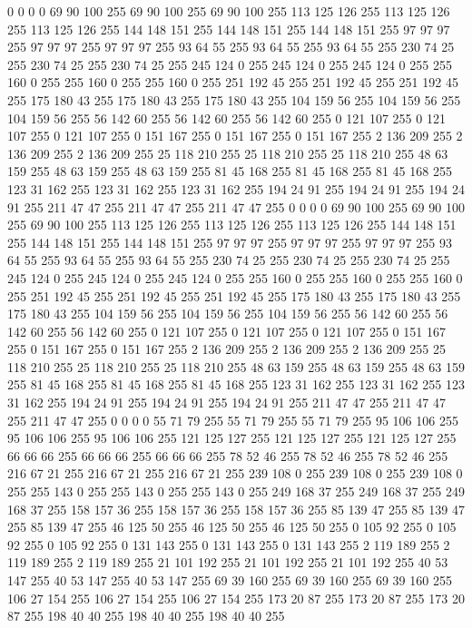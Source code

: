 0 0 0 0 69 90 100 255 69 90 100 255 69 90 100 255 113 125 126 255 113 125 126 255 113 125 126 255 144 148 151 255 144 148 151 255 144 148 151 255 97 97 97 255 97 97 97 255 97 97 97 255 93 64 55 255 93 64 55 255 93 64 55 255
230 74 25 255 230 74 25 255 230 74 25 255 245 124 0 255 245 124 0 255 245 124 0 255 255 160 0 255 255 160 0 255 255 160 0 255 251 192 45 255 251 192 45 255 251 192 45 255 175 180 43 255 175 180 43 255 175 180 43 255 104 159 56 255
104 159 56 255 104 159 56 255 56 142 60 255 56 142 60 255 56 142 60 255 0 121 107 255 0 121 107 255 0 121 107 255 0 151 167 255 0 151 167 255 0 151 167 255 2 136 209 255 2 136 209 255 2 136 209 255 25 118 210 255 25 118 210 255
25 118 210 255 48 63 159 255 48 63 159 255 48 63 159 255 81 45 168 255 81 45 168 255 81 45 168 255 123 31 162 255 123 31 162 255 123 31 162 255 194 24 91 255 194 24 91 255 194 24 91 255 211 47 47 255 211 47 47 255 211 47 47 255
0 0 0 0 69 90 100 255 69 90 100 255 69 90 100 255 113 125 126 255 113 125 126 255 113 125 126 255 144 148 151 255 144 148 151 255 144 148 151 255 97 97 97 255 97 97 97 255 97 97 97 255 93 64 55 255 93 64 55 255 93 64 55 255
230 74 25 255 230 74 25 255 230 74 25 255 245 124 0 255 245 124 0 255 245 124 0 255 255 160 0 255 255 160 0 255 255 160 0 255 251 192 45 255 251 192 45 255 251 192 45 255 175 180 43 255 175 180 43 255 175 180 43 255 104 159 56 255
104 159 56 255 104 159 56 255 56 142 60 255 56 142 60 255 56 142 60 255 0 121 107 255 0 121 107 255 0 121 107 255 0 151 167 255 0 151 167 255 0 151 167 255 2 136 209 255 2 136 209 255 2 136 209 255 25 118 210 255 25 118 210 255
25 118 210 255 48 63 159 255 48 63 159 255 48 63 159 255 81 45 168 255 81 45 168 255 81 45 168 255 123 31 162 255 123 31 162 255 123 31 162 255 194 24 91 255 194 24 91 255 194 24 91 255 211 47 47 255 211 47 47 255 211 47 47 255
0 0 0 0 55 71 79 255 55 71 79 255 55 71 79 255 95 106 106 255 95 106 106 255 95 106 106 255 121 125 127 255 121 125 127 255 121 125 127 255 66 66 66 255 66 66 66 255 66 66 66 255 78 52 46 255 78 52 46 255 78 52 46 255
216 67 21 255 216 67 21 255 216 67 21 255 239 108 0 255 239 108 0 255 239 108 0 255 255 143 0 255 255 143 0 255 255 143 0 255 249 168 37 255 249 168 37 255 249 168 37 255 158 157 36 255 158 157 36 255 158 157 36 255 85 139 47 255
85 139 47 255 85 139 47 255 46 125 50 255 46 125 50 255 46 125 50 255 0 105 92 255 0 105 92 255 0 105 92 255 0 131 143 255 0 131 143 255 0 131 143 255 2 119 189 255 2 119 189 255 2 119 189 255 21 101 192 255 21 101 192 255
21 101 192 255 40 53 147 255 40 53 147 255 40 53 147 255 69 39 160 255 69 39 160 255 69 39 160 255 106 27 154 255 106 27 154 255 106 27 154 255 173 20 87 255 173 20 87 255 173 20 87 255 198 40 40 255 198 40 40 255 198 40 40 255
